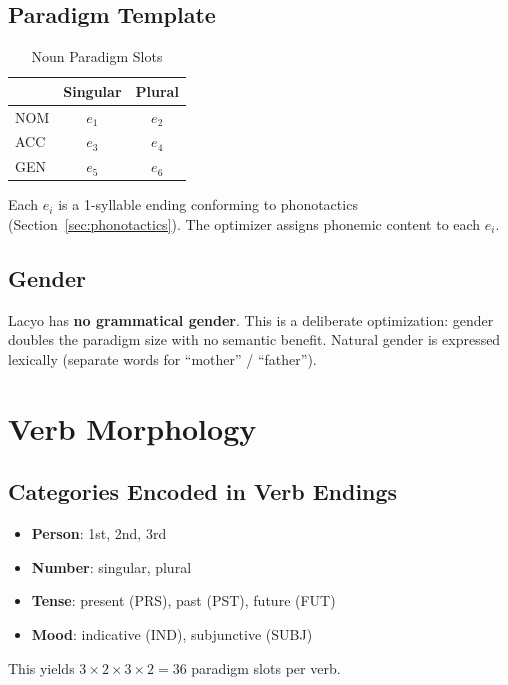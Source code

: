 \documentclass[12pt]{book}
\begin{document}
\subsection{Paradigm Template}

\begin{table}[h]
\centering
\caption{Noun Paradigm Slots}
\label{tab:noun-paradigm}
\begin{tabular}{@{}lcc@{}}
\toprule
         & Singular  & Plural \\
\midrule
NOM      & $e_1$     & $e_2$  \\
ACC      & $e_3$     & $e_4$  \\
GEN      & $e_5$     & $e_6$  \\
\bottomrule
\end{tabular}
\end{table}

\noindent Each $e_i$ is a 1-syllable ending conforming to phonotactics
(Section~\ref{sec:phonotactics}). The optimizer assigns phonemic content
to each $e_i$.

\subsection{Gender}

Lacyo has \textbf{no grammatical gender}. This is a deliberate optimization:
gender doubles the paradigm size with no semantic benefit. Natural gender
is expressed lexically (separate words for ``mother'' / ``father'').


\section{Verb Morphology}
\label{sec:verbs}

\subsection{Categories Encoded in Verb Endings}

\begin{itemize}
  \item \textbf{Person}: 1st, 2nd, 3rd
  \item \textbf{Number}: singular, plural
  \item \textbf{Tense}: present (PRS), past (PST), future (FUT)
  \item \textbf{Mood}: indicative (IND), subjunctive (SUBJ)
\end{itemize}

\noindent This yields $3 \times 2 \times 3 \times 2 = 36$ paradigm slots per verb.
\end{document}
